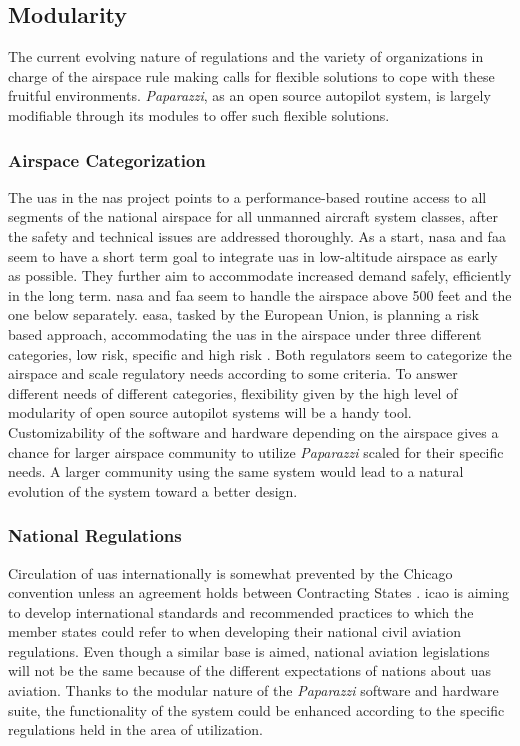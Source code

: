 
\subsection{Modularity}
The current evolving nature of regulations and the variety of organizations in charge of the airspace rule making calls for flexible solutions to cope with these fruitful environments. \emph{Paparazzi}, as an open source autopilot system, is largely modifiable through its modules to offer such flexible solutions.  

\subsubsection{Airspace Categorization}
The \gls{uas} in the \gls{nas} project points to a performance-based routine access to all segments of the national airspace for all unmanned aircraft system classes, after the safety and technical issues are addressed thoroughly. As a start, \gls{nasa} and \gls{faa} seem to have a short term goal to integrate \gls{uas} in low-altitude airspace as early as possible. They further aim to accommodate increased demand safely, efficiently in the long term. \gls{nasa} and \gls{faa} seem to handle the airspace above 500 feet and the one below separately. \gls{easa}, tasked by the European Union, is planning a risk based approach, accommodating the \gls{uas} in the airspace under three different categories, low risk, specific and high risk \cite{A_NPA_EASA2015}. Both regulators seem to categorize the airspace and scale regulatory needs according to some criteria. To answer different needs of different categories, flexibility given by the high level of modularity of open source autopilot systems will be a handy tool. 
Customizability of the software and hardware depending on the airspace gives a chance for larger airspace community to utilize \emph{Paparazzi} scaled for their specific needs. A larger community using the same system would lead to a natural evolution of the system toward a better design.

\subsubsection{National Regulations}
Circulation of \gls{uas} internationally is somewhat prevented by the Chicago convention unless an agreement holds between Contracting States \cite{A_NPA_EASA2015}. \gls{icao} is aiming to develop international standards and recommended practices to which the member states could refer to when developing their national civil aviation regulations. Even though a similar base is aimed, national aviation legislations will not be the same because of the different expectations of nations about \gls{uas} aviation. Thanks to the modular nature of the \emph{Paparazzi} software and hardware suite, the functionality of the system could be enhanced according to the specific regulations held in the area of utilization.

